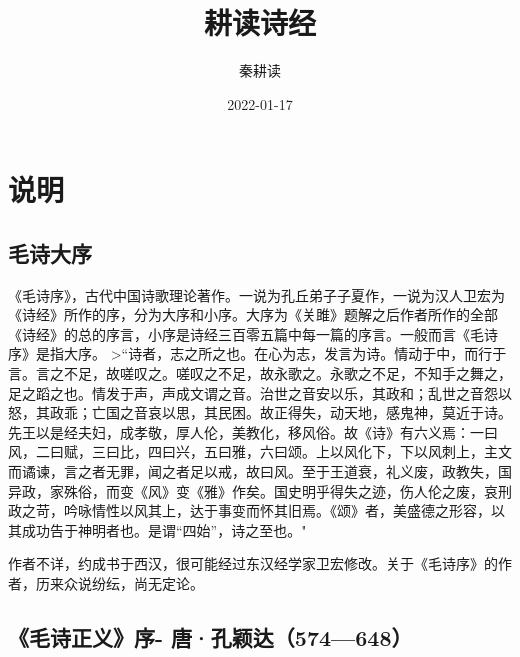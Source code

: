 \documentclass[
]{book}
\title{耕读诗经}
\author{秦耕读}
\date{2022-01-17}
\theoremstyle{definition}
\theoremstyle{definition}
\theoremstyle{definition}
\theoremstyle{definition}
\theoremstyle{remark}
\begin{document}
\maketitle

{
\setcounter{tocdepth}{1}
\tableofcontents
}
\hypertarget{ux8bf4ux660e}{%
\chapter{说明}\label{ux8bf4ux660e}}

\hypertarget{ux6bdbux8bd7ux5927ux5e8f}{%
\section{毛诗大序}\label{ux6bdbux8bd7ux5927ux5e8f}}

《毛诗序》，古代中国诗歌理论著作。一说为孔丘弟子子夏作，一说为汉人卫宏为《诗经》所作的序，分为大序和小序。大序为《关雎》题解之后作者所作的全部《诗经》的总的序言，小序是诗经三百零五篇中每一篇的序言。一般而言《毛诗序》是指大序。
\textgreater{}``诗者，志之所之也。在心为志，发言为诗。情动于中，而行于言。言之不足，故嗟叹之。嗟叹之不足，故永歌之。永歌之不足，不知手之舞之，足之蹈之也。情发于声，声成文谓之音。治世之音安以乐，其政和；乱世之音怨以怒，其政乖；亡国之音哀以思，其民困。故正得失，动天地，感鬼神，莫近于诗。先王以是经夫妇，成孝敬，厚人伦，美教化，移风俗。故《诗》有六义焉：一曰风，二曰赋，三曰比，四曰兴，五曰雅，六曰颂。上以风化下，下以风刺上，主文而谲谏，言之者无罪，闻之者足以戒，故曰风。至于王道衰，礼义废，政教失，国异政，家殊俗，而变《风》变《雅》作矣。国史明乎得失之迹，伤人伦之废，哀刑政之苛，吟咏情性以风其上，达于事变而怀其旧焉。《颂》者，美盛德之形容，以其成功告于神明者也。是谓``四始''，诗之至也。"

作者不详，约成书于西汉，很可能经过东汉经学家卫宏修改。关于《毛诗序》的作者，历来众说纷纭，尚无定论。

\hypertarget{ux6bdbux8bd7ux6b63ux4e49ux5e8f--ux5510ux5b54ux9896ux8fbe574648}{%
\section{《毛诗正义》序- 唐·孔颖达（574---648）}\label{ux6bdbux8bd7ux6b63ux4e49ux5e8f--ux5510ux5b54ux9896ux8fbe574648}}
\end{document}
